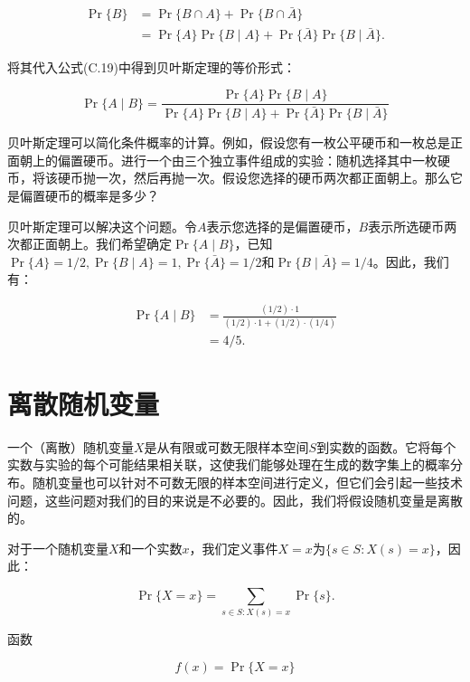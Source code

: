 \documentclass[lang=cn,newtx,10pt,scheme=chinese]{elegantbook}
\begin{document}
$$
\begin{aligned}
\operatorname{Pr}\{B\} & =\operatorname{Pr}\{B \cap A\}+\operatorname{Pr}\{B \cap \bar{A}\} \\
& =\operatorname{Pr}\{A\} \operatorname{Pr}\{B \mid A\}+\operatorname{Pr}\{\bar{A}\} \operatorname{Pr}\{B \mid \bar{A}\} .
\end{aligned}
$$

将其代入公式(C.19)中得到贝叶斯定理的等价形式：

$$
\operatorname{Pr}\{A \mid B\}=\frac{\operatorname{Pr}\{A\} \operatorname{Pr}\{B \mid A\}}{\operatorname{Pr}\{A\} \operatorname{Pr}\{B \mid A\}+\operatorname{Pr}\{\bar{A}\} \operatorname{Pr}\{B \mid \bar{A}\}}
$$

贝叶斯定理可以简化条件概率的计算。例如，假设您有一枚公平硬币和一枚总是正面朝上的偏置硬币。进行一个由三个独立事件组成的实验：随机选择其中一枚硬币，将该硬币抛一次，然后再抛一次。假设您选择的硬币两次都正面朝上。那么它是偏置硬币的概率是多少？

贝叶斯定理可以解决这个问题。令$A$表示您选择的是偏置硬币，$B$表示所选硬币两次都正面朝上。我们希望确定$\operatorname{Pr}\{A \mid B\}$，已知$\operatorname{Pr}\{A\}=1 / 2, \operatorname{Pr}\{B \mid A\}=1, \operatorname{Pr}\{\bar{A}\}=1 / 2$和$\operatorname{Pr}\{B \mid \bar{A}\}=1 / 4$。因此，我们有：

$$
\begin{aligned}
\operatorname{Pr}\{A \mid B\} & =\frac{(1 / 2) \cdot 1}{(1 / 2) \cdot 1+(1 / 2) \cdot(1 / 4)} \\
& =4 / 5 .
\end{aligned}
$$

\section{离散随机变量}

一个（离散）随机变量$X$是从有限或可数无限样本空间$S$到实数的函数。它将每个实数与实验的每个可能结果相关联，这使我们能够处理在生成的数字集上的概率分布。随机变量也可以针对不可数无限的样本空间进行定义，但它们会引起一些技术问题，这些问题对我们的目的来说是不必要的。因此，我们将假设随机变量是离散的。

对于一个随机变量$X$和一个实数$x$，我们定义事件$X=x$为$\{s \in S: X(s)=x\}$，因此：

$$
\operatorname{Pr}\{X=x\}=\sum_{s \in S: X(s)=x} \operatorname{Pr}\{s\} .
$$

函数

$$
f(x)=\operatorname{Pr}\{X=x\}
$$
\end{document}
